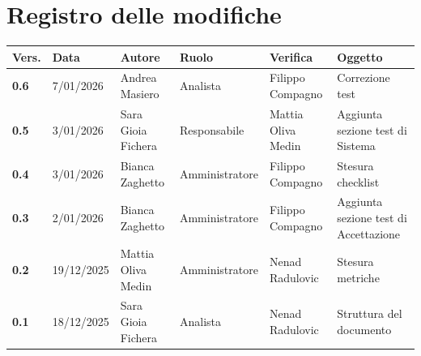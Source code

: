 \documentclass[a4paper,12pt]{article}
\begin{document}
    

    \section*{Registro delle modifiche} {
        \begin{table}[h!]
                \begin{tabularx}{\textwidth}{|l|l|l|l|L|L|}
                \hline
                \textbf{Vers.} & \textbf{Data} & \textbf{Autore} & \textbf{Ruolo} & \textbf{Verifica} & \textbf{Oggetto} \\
                \hline
                \textbf{0.6} & 7/01/2026 & Andrea Masiero & Analista & Filippo Compagno & Correzione test \\
                \hline
                \textbf{0.5} & 3/01/2026 & Sara Gioia Fichera & Responsabile & Mattia Oliva Medin & Aggiunta sezione test di Sistema \\
                \hline
                \textbf{0.4} & 3/01/2026 & Bianca Zaghetto & Amministratore & Filippo Compagno & Stesura checklist \\
                \hline
                \textbf{0.3} & 2/01/2026 & Bianca Zaghetto & Amministratore & Filippo Compagno & Aggiunta sezione test di Accettazione \\
                \hline
                \textbf{0.2} & 19/12/2025 & Mattia Oliva Medin & Amministratore & Nenad Radulovic & Stesura metriche\\
                \hline
                \textbf{0.1} & 18/12/2025 & Sara Gioia Fichera & Analista & Nenad Radulovic & Struttura del documento \\
                \hline
            \end{tabularx}
        \end{table}
    }
    \newpage
    
    \tableofcontents
    \newpage

    \listoftables
    \newpage

    \listoffigures
    \newpage
    
\end{document}
